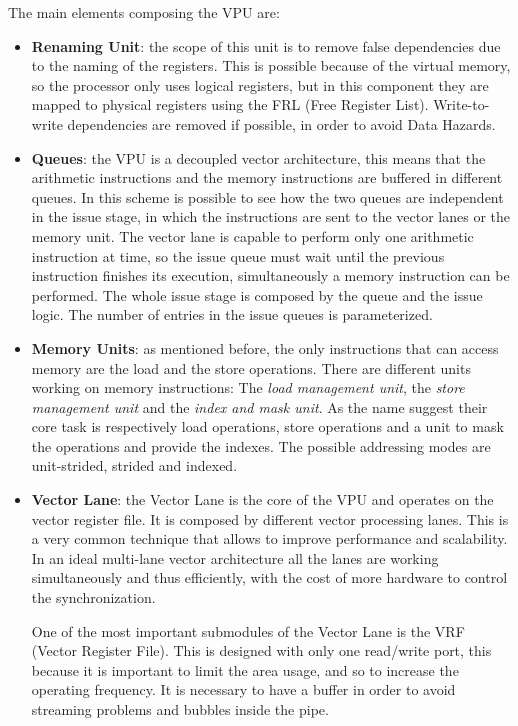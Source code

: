 The main elements composing the VPU are:
\begin{itemize}
    \item \textbf{Renaming Unit}: the scope of this unit is to remove false dependencies due to the naming of the registers. This is possible because of the virtual memory, so the processor only uses logical registers, but in this component they are mapped to physical registers using the FRL (Free Register List).
    Write-to-write dependencies are removed if possible, in order to avoid Data Hazards.
 
    \item \textbf{Queues}: the VPU is a decoupled vector architecture, this means that the arithmetic instructions and the memory instructions are buffered in different queues.
    In this scheme is possible to see how the two queues are independent in the issue stage, in which the instructions are sent to the vector lanes or the memory unit.
    The vector lane is capable to perform only one arithmetic instruction at time, so the issue queue must wait until the previous instruction finishes its execution, simultaneously a memory instruction can be performed.
    The whole issue stage is composed by the queue and the issue logic. The number of entries in the issue queues is parameterized.
    
    \item \textbf{Memory Units}: as mentioned before, the only instructions that can access memory are the load and the store operations. There are different units working on memory instructions: The \emph{load management unit}, the \emph{store management unit} and the \emph{index and mask unit}. As the name suggest their core task is respectively load operations, store operations and a unit to mask the operations and provide the indexes.
    The possible addressing modes are unit-strided, strided and indexed.
    

    
    \item \textbf{Vector Lane}: the Vector Lane is the core of the VPU and operates on the vector register file. It is composed by different vector processing lanes. This is a very common technique that allows to improve performance and scalability.
    In an ideal multi-lane vector architecture all the lanes are working simultaneously and thus efficiently, with the cost of more hardware to control the synchronization.
    
    One of the most important submodules of the Vector Lane is the VRF (Vector Register File). This is designed with only one read/write port, this because it is important to limit the area usage, and so to increase the operating frequency. It is necessary to have a buffer in order to avoid streaming problems and bubbles inside the pipe.
    

\end{itemize}
